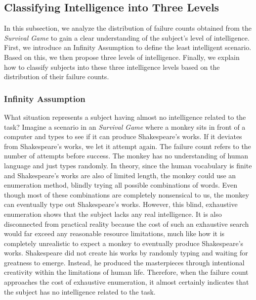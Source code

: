 \subsection{Classifying Intelligence into Three Levels}


In this subsection, we analyze the distribution of failure counts obtained from the \textit{Survival Game} to gain a clear understanding of the subject's level of intelligence. First, we introduce an Infinity Assumption to define the least intelligent scenario. Based on this, we then propose three levels of intelligence. Finally, we explain how to classify subjects into these three intelligence levels based on the distribution of their failure counts.



\subsubsection{Infinity Assumption}

What situation represents a subject having almost no intelligence related to the task? Imagine a scenario in an \textit{Survival Game} where a monkey sits in front of a computer and types to see if it can produce Shakespeare’s works. If it deviates from Shakespeare’s works, we let it attempt again. The failure count refers to the number of attempts before success. The monkey has no understanding of human language and just types randomly. In theory, since the human vocabulary is finite and Shakespeare’s works are also of limited length, the monkey could use an enumeration method, blindly trying all possible combinations of words. Even though most of these combinations are completely nonsensical to us, the monkey can eventually type out Shakespeare's works. However, this blind, exhaustive enumeration shows that the subject lacks any real intelligence. It is also disconnected from practical reality because the cost of such an exhaustive search would far exceed any reasonable resource limitations, much like how it is completely unrealistic to expect a monkey to eventually produce Shakespeare’s works. Shakespeare did not create his works by randomly typing and waiting for greatness to emerge. Instead, he produced the masterpieces through intentional creativity within the limitations of human life. Therefore, when the failure count approaches the cost of exhaustive enumeration, it almost certainly indicates that the subject has no intelligence related to the task.


